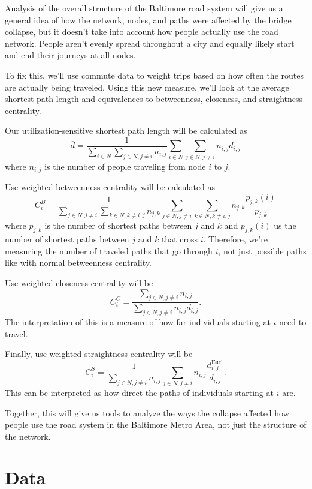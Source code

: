 \documentclass[11pt]{article}
\numberwithin{equation}{section} %
\numberwithin{figure}{section} %
\numberwithin{table}{section} %
\theoremstyle{definition}
\begin{document}
Analysis of the overall structure of the Baltimore road system will give us a general idea of how the network, nodes, and paths were affected by the bridge collapse, but it doesn't take into account how people actually use the road network. People aren't evenly spread throughout a city and equally likely start and end their journeys at all nodes.

To fix this, we'll use commute data to weight trips based on how often the routes are actually being traveled. Using this new measure, we'll look at the average shortest path length and equivalences to betweenness, closeness, and straightness centrality.

Our utilization-sensitive shortest path length will be calculated as
\[
  \overline{d} = \frac{1}{\sum_{i \in N} \sum_{j \in N, j \neq i} n_{i, j}} \sum_{i \in N} \sum_{j \in N, j \neq i} n_{i, j} d_{i, j}
\]
where $n_{i, j}$ is the number of people traveling from node $i$ to $j$.

Use-weighted betweenness centrality will be calculated as
\[
  C_i^B = \frac{1}{\sum_{j \in N, j \neq i} \sum_{k \in N, k \neq i, j} n_{j, k}} \sum_{j \in N, j \neq i} \sum_{k \in N, k \neq i, j} n_{j, k} \frac{p_{j, k} (i)}{p_{j, k}}
\]
where $p_{j, k}$ is the number of shortest paths between $j$ and $k$ and $p_{j, k} (i)$ us the number of shortest paths between $j$ and $k$ that cross $i$. Therefore, we're measuring the number of traveled paths that go through $i$, not just possible paths like with normal betweenness centrality.

Use-weighted closeness centrality will be
\[
  C_i^C = \frac{\sum_{j \in N, j \neq i} n_{i, j}}{\sum_{j \in N, j \neq i} n_{i, j} d_{i, j}}.
\]
The interpretation of this is a measure of how far individuals starting at $i$ need to travel.

Finally, use-weighted straightness centrality will be
\[
  C_i^S = \frac{1}{\sum_{j \in N, j \neq i} n_{i, j}} \sum_{j \in N, j \neq i} n_{i, j} \frac{d_{i, j}^\text{Eucl}}{d_{i, j}}.
\]
This can be interpreted as how direct the paths of individuals starting at $i$ are.

Together, this will give us tools to analyze the ways the collapse affected how people use the road system in the Baltimore Metro Area, not just the structure of the network.


\section{Data} \label{sec:data}
\end{document}
